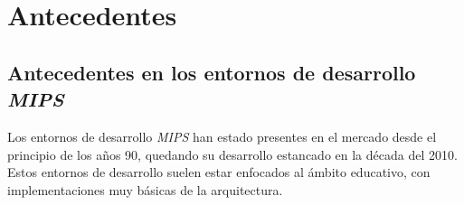 \chapter{Antecedentes}\label{ch:antecedentes}


\section{Antecedentes en los entornos de desarrollo \textit{MIPS}}
\label{sec:antecedentes-en-los-entornos-de-desarrollo-mips}

Los entornos de desarrollo \textit{MIPS} han estado presentes en
el mercado desde el principio de los años 90, quedando su desarrollo
estancado en la década del 2010.
Estos entornos de desarrollo suelen estar enfocados al ámbito
educativo, con implementaciones muy básicas de la arquitectura.

